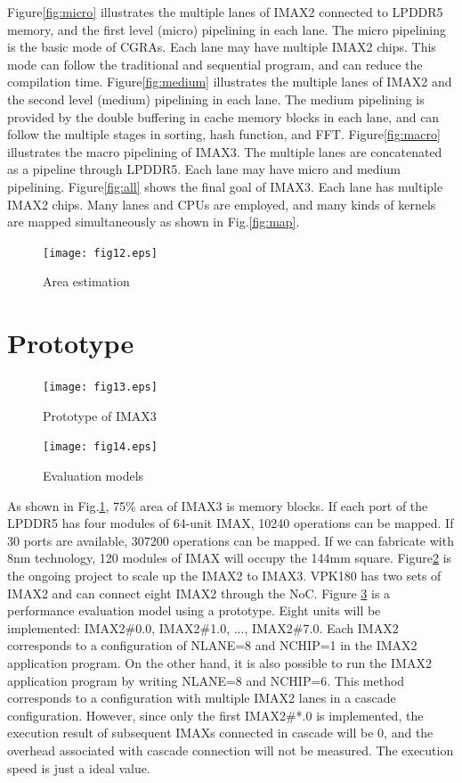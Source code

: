 Figure\ref{fig:micro} illustrates the multiple lanes of IMAX2 connected to
LPDDR5 memory, and the first level (micro) pipelining in each lane.  The micro
pipelining is the basic mode of CGRAs.  Each lane may have multiple IMAX2
chips.  This mode can follow the traditional and sequential program, and can
reduce the compilation time.  Figure\ref{fig:medium} illustrates the
multiple lanes of IMAX2 and the second level (medium) pipelining in each
lane.  The medium pipelining is provided by the double buffering in cache
memory blocks in each lane, and can follow the multiple stages in sorting,
hash function, and FFT. Figure\ref{fig:macro} illustrates the macro
pipelining of IMAX3.  The multiple lanes are concatenated as a pipeline
through LPDDR5.  Each lane may have micro and medium pipelining.
Figure\ref{fig:all} shows the final goal of IMAX3. Each lane has multiple
IMAX2 chips.  Many lanes and CPUs are employed, and many kinds of kernels
are mapped simultaneously as shown in Fig.\ref{fig:map}.

\begin{figure}[htbp]
\center
\texttt{[image: fig12.eps]}
\caption{\label{fig:chip}Area estimation}
\end{figure}

\clearpage

\section{Prototype}

\begin{figure}[htbp]
\center
\texttt{[image: fig13.eps]}
\caption{\label{fig:proto}Prototype of IMAX3}
\end{figure}

\begin{figure}[htbp]
\center
\texttt{[image: fig14.eps]}
\caption{\label{fig:evmodel}Evaluation models}
\end{figure}

As shown in Fig.\ref{fig:chip}, 75\% area of IMAX3 is memory blocks. If each
port of the LPDDR5 has four modules of 64-unit IMAX, 10240 operations can be
mapped. If 30 ports are available, 307200 operations can be mapped. If we
can fabricate with 8nm technology, 120 modules of IMAX will occupy the 144mm
square.  Figure\ref{fig:proto} is the ongoing project to scale up the IMAX2
to IMAX3. VPK180 has two sets of IMAX2 and can connect eight IMAX2 through
the NoC. Figure \ref{fig:evmodel} is a performance evaluation model using a
prototype. Eight units will be implemented: IMAX2\#0.0, IMAX2\#1.0, ...,
IMAX2\#7.0. Each IMAX2 corresponds to a configuration of NLANE=8 and NCHIP=1
in the IMAX2 application program. On the other hand, it is also possible to
run the IMAX2 application program by writing NLANE=8 and NCHIP=6. This
method corresponds to a configuration with multiple IMAX2 lanes in a cascade
configuration. However, since only the first IMAX2\#*.0 is implemented, the
execution result of subsequent IMAXs connected in cascade will be 0, and the
overhead associated with cascade connection will not be measured. The
execution speed is just a ideal value.
